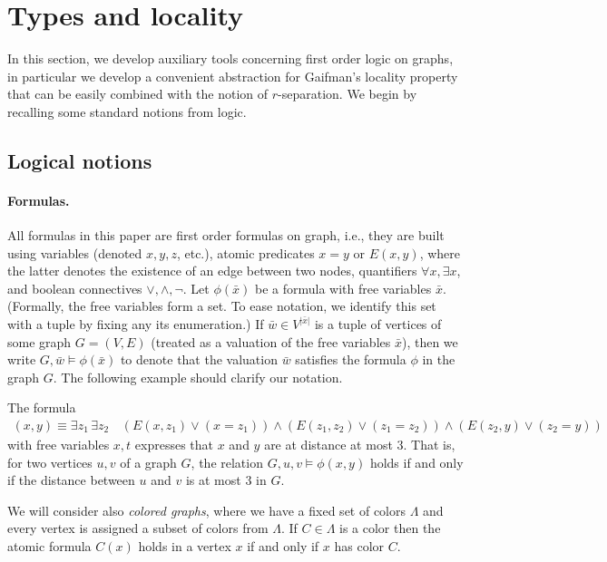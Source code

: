 \section{Types and locality}\label{sec:gaifman}
In this section, we develop auxiliary tools concerning first order logic on graphs, 
in particular we develop a convenient abstraction for Gaifman's locality property that can be easily combined with the notion of $r$-separation.
We begin by recalling some standard notions from logic.

\subsection{Logical notions}

\paragraph{Formulas.}
All formulas in this paper are first order formulas on graph,
i.e., they are built using variables (denoted $x,y,z$, etc.),
atomic predicates $x=y$ or $E(x,y)$,
where the latter denotes the existence of an edge between two nodes, quantifiers $\forall x,\exists x$, and boolean connectives $\lor,\land,\neg$. 
Let $\phi(\bar x)$ be a formula with free variables 
$\bar x$. (Formally, the free variables form a set.
To ease notation, we identify this set with a tuple by fixing any its enumeration.)
If $\bar w\in V^{|\bar x|}$ is a tuple of vertices of some graph $G=(V,E)$ (treated as a valuation of the free variables $\bar x$), then we write $G,\bar w\models \phi(\bar x)$
to denote that the valuation $\bar w$ satisfies the formula $\phi$ in the graph $G$.
The following example should clarify our notation.

\begin{example}\label{ex:dist-formula}
The formula
\begin{align*}
(x,y)\equiv \exists z_1\, \exists z_2\, & (E(x,z_1)\lor (x=z_1))\land (E(z_1,z_2) 
 \lor (z_1=z_2))\land (E(z_2,y)\lor (z_2=y))
\end{align*}
with free variables $x,t$ expresses that $x$ and $y$ are at distance at most $3$.
That is, for two vertices $u,v$ of a graph $G$,
the relation $G,u,v\models \phi(x,y)$ holds 
if and only if the distance between $u$ and $v$ is at most $3$ in $G$.
\end{example}

We will consider also \emph{colored graphs},
where we have a fixed set of colors $\Lambda$ and every vertex is assigned a subset of colors from 
$\Lambda$. If $C\in \Lambda$ is a color then the atomic formula $C(x)$ holds in a vertex $x$ if and only if $x$ has color $C$.

